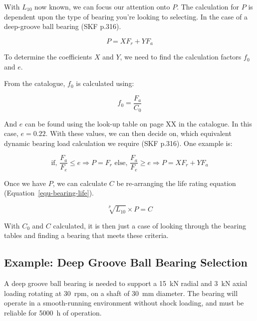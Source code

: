 With \(L_{10}\) now known, we can focus our attention onto \(P\). The calculation for \(P\) is dependent upon the type of bearing you're looking to selecting. In the case of a deep-groove ball bearing (SKF p.316).

\begin{equation}
  P = XF_r + YF_a
\end{equation}

To determine the coefficients \(X\) and \(Y\), we need to find the calculation factors \(f_0\) and \(e\).

From the catalogue, \(f_0\) is calculated using:

\begin{equation}
  f_0 = \frac{F_a}{C_0}
\end{equation}

And \(e\) can be found using the look-up table on page XX in the catalogue. In this case, \(e=0.22\). With these values, we can then decide on, which equivalent dynamic bearing load calculation we require (SKF p.316). One example is:

\begin{equation}
 \text{if, }\frac{F_a}{F_e}\le e \Rightarrow P=F_r \text{ else, } \frac{F_a}{F_e}\ge e \Rightarrow P=XF_r+YF_a
\end{equation}

Once we have \(P\), we can calculate \(C\) be re-arranging the life rating equation (Equation~\ref{equ-bearing-life}). 

\begin{equation}
  \sqrt[p]{L_{10}}\times P = C
\end{equation} 

With \(C_0\) and \(C\) calculated, it is then just a case of looking through the bearing tables and finding a bearing that meets these criteria.

\subsection{Example: Deep Groove Ball Bearing Selection}

A deep groove ball bearing is needed to support a \SI{15}{\kilo\newton} radial and \SI{3}{\kilo\newton} axial loading rotating at \SI{30}{rpm}, on a shaft of \SI{30}{\milli\metre} diameter. The bearing will operate in a smooth-running environment without shock loading, and must be reliable for \SI{5000}{\hour} of operation.

